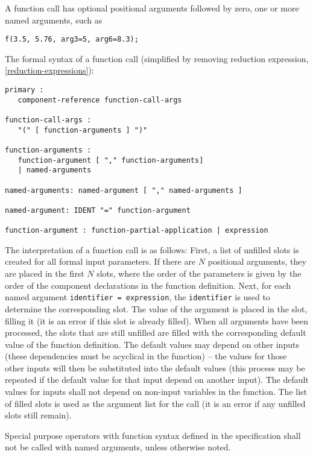 A function call has optional positional arguments followed by zero, one
or more named arguments, such as

\begin{lstlisting}[language=modelica]
f(3.5, 5.76, arg3=5, arg6=8.3);
\end{lstlisting}

The formal syntax of a function call (simplified by removing reduction
expression, \cref{reduction-expressions}):
\begin{lstlisting}[language=grammar]
primary :
   component-reference function-call-args

function-call-args :
   "(" [ function-arguments ] ")"

function-arguments :
   function-argument [ "," function-arguments]
   | named-arguments

named-arguments: named-argument [ "," named-arguments ]

named-argument: IDENT "=" function-argument

function-argument : function-partial-application | expression
\end{lstlisting}

The interpretation of a function call is as follows: First, a list of unfilled slots is created for all formal input parameters.  If there are $N$ positional arguments, they are placed in the first
$N$ slots, where the order of the parameters is given by the order of the component declarations in the function definition.  Next, for each named argument \lstinline!identifier = expression!, the
\lstinline!identifier! is used to determine the corresponding slot.  The value of the argument is placed in the slot, filling it (it is an error if this slot is already filled).  When all arguments
have been processed, the slots that are still unfilled are filled with the corresponding default value of the function definition.  The default values may depend on other inputs (these dependencies
must be acyclical in the function) -- the values for those other inputs will then be substituted into the default values (this process may be repeated if the default value for that input depend on another input).  The default values for inputs shall not depend on non-input variables in the function.  The list of filled slots is used as the argument list for the call (it is an error if any
unfilled slots still remain).

Special purpose operators with function syntax defined in the
specification shall not be called with named arguments, unless otherwise
noted.

